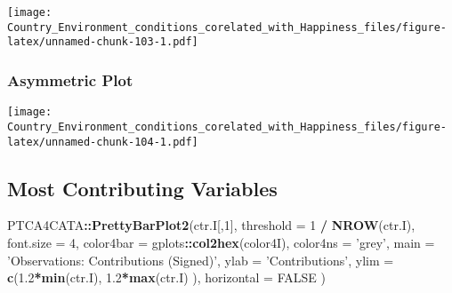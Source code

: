 \documentclass[]{book}
\newenvironment{Shaded}{\begin{snugshade}}{\end{snugshade}}
\newcommand{\DataTypeTok}[1]{\textcolor[rgb]{0.13,0.29,0.53}{#1}}
\newcommand{\DecValTok}[1]{\textcolor[rgb]{0.00,0.00,0.81}{#1}}
\newcommand{\FloatTok}[1]{\textcolor[rgb]{0.00,0.00,0.81}{#1}}
\newcommand{\KeywordTok}[1]{\textcolor[rgb]{0.13,0.29,0.53}{\textbf{#1}}}
\newcommand{\NormalTok}[1]{#1}
\newcommand{\OperatorTok}[1]{\textcolor[rgb]{0.81,0.36,0.00}{\textbf{#1}}}
\newcommand{\OtherTok}[1]{\textcolor[rgb]{0.56,0.35,0.01}{#1}}
\newcommand{\StringTok}[1]{\textcolor[rgb]{0.31,0.60,0.02}{#1}}
\begin{document}
\texttt{[image: Country\_Environment\_conditions\_corelated\_with\_Happiness\_files/figure-latex/unnamed-chunk-103-1.pdf]}

\hypertarget{asymmetric-plot}{%
\subsubsection{Asymmetric Plot}\label{asymmetric-plot}}

\begin{Shaded}
\end{Shaded}

\texttt{[image: Country\_Environment\_conditions\_corelated\_with\_Happiness\_files/figure-latex/unnamed-chunk-104-1.pdf]}

\hypertarget{most-contributing-variables-2}{%
\subsection{Most Contributing
Variables}\label{most-contributing-variables-2}}

\begin{Shaded}
\begin{Highlighting}[]
\NormalTok{PTCA4CATA}\OperatorTok{::}\KeywordTok{PrettyBarPlot2}\NormalTok{(ctr.I[,}\DecValTok{1}\NormalTok{], }
                       \DataTypeTok{threshold =} \DecValTok{1} \OperatorTok{/}\StringTok{ }\KeywordTok{NROW}\NormalTok{(ctr.I), }
                       \DataTypeTok{font.size =} \DecValTok{4}\NormalTok{, }
                       \DataTypeTok{color4bar =}\NormalTok{ gplots}\OperatorTok{::}\KeywordTok{col2hex}\NormalTok{(color4I), }
                       \DataTypeTok{color4ns =} \StringTok{'grey'}\NormalTok{, }
                       \DataTypeTok{main =} \StringTok{'Observations: Contributions (Signed)'}\NormalTok{, }
                       \DataTypeTok{ylab =} \StringTok{'Contributions'}\NormalTok{, }\DataTypeTok{ylim =} \KeywordTok{c}\NormalTok{(}\FloatTok{1.2}\OperatorTok{*}\KeywordTok{min}\NormalTok{(ctr.I),}
                        \FloatTok{1.2}\OperatorTok{*}\KeywordTok{max}\NormalTok{(ctr.I) ), }
                       \DataTypeTok{horizontal =} \OtherTok{FALSE}\NormalTok{ ) }
\end{Highlighting}
\end{Shaded}
\end{document}
